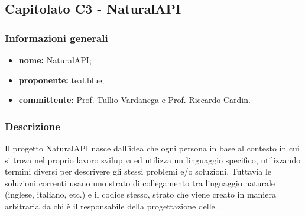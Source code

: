 

    \subsection{Capitolato C3 - NaturalAPI}
       \subsubsection{Informazioni generali}
       \begin{itemize}
           \item \textbf{nome:} NaturalAPI;
           \item \textbf{proponente:} teal.blue;
           \item \textbf{committente:} Prof. Tullio Vardanega e Prof. Riccardo Cardin.
       \end{itemize}

    \subsubsection{Descrizione}
 		Il progetto NaturalAPI nasce dall'idea che ogni persona in base al contesto in cui si trova nel proprio lavoro sviluppa ed utilizza un linguaggio specifico, utilizzando termini diversi per descrivere gli stessi problemi e/o soluzioni. Tuttavia le soluzioni correnti usano uno strato di collegamento tra linguaggio naturale (inglese, italiano, etc.) e il codice stesso, strato che viene creato in maniera arbitraria da chi è il responsabile della progettazione delle .
